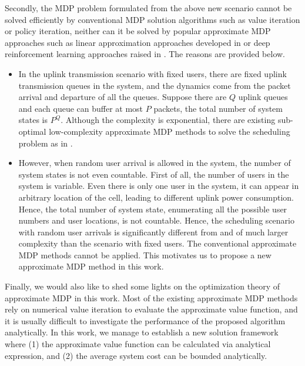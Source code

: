 \documentclass[12pt,onecolumn]{IEEEtran}
\begin{document}
{Secondly, the MDP problem formulated from the above new scenario cannot be solved efficiently by conventional MDP solution algorithms such as value iteration or policy iteration, neither can it be solved by popular approximate MDP approaches such as linear approximation approaches developed in \cite{YCui2010AMDP-OFDM-downlink,YCui2010AMDP-OFDM-uplink,RWang2011DistTowHopMIMO,RWang2011QueueAwareCoorp, RWang2013RelayApproxMDP,YSun2019PushingCaching,BLv2019Cache} or deep reinforcement learning approaches raised in \cite{XQiu2019DRL-MEC,LTan2018DRL-Cache-MEC,JWang2019ResorceAlloc-MEC,YLiu2019DRL-VehicleEdge,YHe2018cache-comp-DRL}. The reasons are provided below.
\begin{itemize}
\item In the uplink transmission scenario with fixed users, there are fixed uplink transmission queues in the system, and the dynamics come from the packet  arrival and departure of all the queues. Suppose there are $Q$ uplink queues and each queue can buffer at most $P$ packets, the total number of system states is $P^Q$. Although the complexity is exponential, there are existing sub-optimal low-complexity approximate MDP methods to solve the scheduling problem as in \cite{YCui2010AMDP-OFDM-downlink,YCui2010AMDP-OFDM-uplink,RWang2011DistTowHopMIMO,RWang2011QueueAwareCoorp, RWang2013RelayApproxMDP,YSun2019PushingCaching,BLv2019Cache}. 
\item However, when random user arrival is allowed in the system, the number of system states is not even countable. First of all, the number of users in the system is variable. Even there is only one user in the system, it can appear in arbitrary location of the cell, leading to different uplink power consumption. Hence, the total number of system state, enumerating all the possible user numbers and user locations, is not countable. Hence, the scheduling scenario with random user arrivals is significantly different from and of much larger complexity than the scenario with fixed users. The conventional approximate MDP methods cannot be applied. This motivates us to propose a new approximate MDP method in this work. 
\end{itemize}

Finally, we would also like to shed some lights on the optimization theory of approximate MDP in this work. Most of the existing approximate MDP methods rely on numerical value iteration to evaluate the approximate value function, and it is usually difficult to investigate the performance of the proposed algorithm analytically. In this work, we manage to establish a new solution framework where (1) the approximate value function can be calculated via analytical expression, and (2) the average system cost can be bounded analytically.
}
\end{document}
